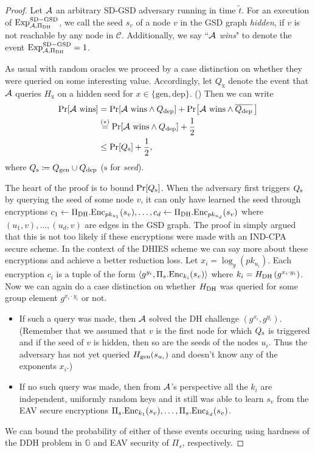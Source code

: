 \begin{proof}
	Let $\mathcal{A}$ an arbitrary SD-GSD adversary running in time $\tilde{t}$. For an execution of $\mathrm{Exp}_{\mathcal{A}, \Pi_{\mathrm{DH}}}^{\mathrm{SD-GSD}}$, we call the seed $s_v$ of a node $v$ in the GSD graph \emph{hidden}, if $v$ is not reachable by any node in $\mathcal{C}$. Additionally, we say ``\emph{$\mathcal{A}$ wins}" to denote the event $\mathrm{Exp}_{\mathcal{A}, \Pi_{\mathrm{DH}}}^{\mathrm{SD-GSD}} = 1$.

	As usual with random oracles we proceed by a case distinction on whether they were queried on some interesting value. Accordingly, let $Q_{\mathrm{x}}$ denote the event that $\mathcal{A}$ queries $H_{\mathrm{x}}$ on a hidden seed for $x \in \{\mathrm{gen}, \mathrm{dep}\}$. () Then we can write
	\begin{align*}
		\pr{\wins} & = \pr{\wins \land \qdep} + \pr{\wins \land \overline{\qdep} \,} \\
		           & \stackrel{(*)}{=}  \pr{\wins \land \qdep} + \frac{1}{2}         \\
		           & \le \pr{\qs} + \frac{1}{2},
	\end{align*}
	where $Q_\mathrm{s} \coloneqq Q_\mathrm{gen} \cup Q_\mathrm{dep}$ ($\mathrm{s}$ for \emph{seed}).


	The heart of the proof is to bound $\pr{\qs}$. When the adversary first triggers $Q_\mathrm{s}$ by querying the seed of some node $v$, it can only have learned the seed through encryptions $c_1 \leftarrow \Pi_{\mathrm{DH}}.\mathrm{Enc}_{pk_{u_1}}(s_v), \ldots, c_d \leftarrow \Pi_{\mathrm{DH}}.\mathrm{Enc}_{pk_{u_d}}(s_v)$ where $(u_1, v), \ldots, (u_d, v)$ are edges in the GSD graph. The proof in \cite{ttkem} simply argued that this is not too likely if these encryptions were made with an IND-CPA secure scheme. In the context of the DHIES scheme we can say more about these encryptions and achieve a better reduction loss. Let $x_i = \log_g(pk_{u_i})$. Each encryption $c_i$ is a tuple of the form $\langle g^{y_i}, \Pi_s.\mathrm{Enc}_{k_i}(s_v) \rangle$ where $k_i = H_\mathrm{DH}\left(g^{x_i \cdot y_i}\right)$. Now we can again do a case distinction on whether $H_\mathrm{DH}$ was queried for some group element $g^{x_i \cdot y_i}$ or not.
	\begin{itemize}
		\item If such a query was made, then $\mathcal{A}$ solved the DH challenge $(g^{x_i}, g^{y_i})$. (Remember that we assumed that $v$ is the first node for which $Q_\mathrm{s}$ is triggered and if the seed of $v$ is hidden, then so are the seeds of the nodes $u_i$. Thus the adversary has not yet queried $H_\mathrm{gen}(s_{u_i})$ and doesn't know any of the exponents $x_i$.)
		\item If no such query was made, then from $\mathcal{A}$'s perspective all the $k_i$ are independent, uniformly random keys and it still was able to learn $s_v$ from the EAV secure encryptions $\Pi_s.\mathrm{Enc}_{k_1}(s_v), \ldots, \Pi_s.\mathrm{Enc}_{k_d}(s_v)$.
	\end{itemize}
	We can bound the probability of either of these events occuring using hardness of the DDH problem in $\mathbb{G}$ and EAV security of $\Pi_s$, respectively.


\end{proof}
